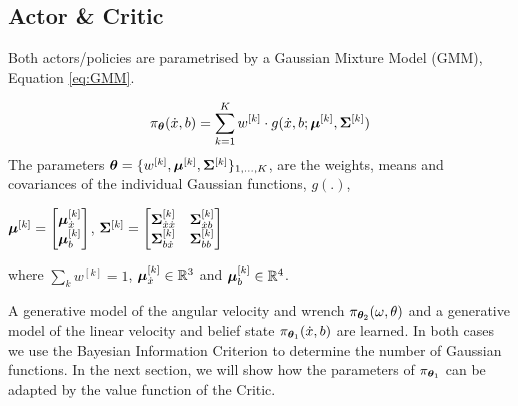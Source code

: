 \subsection{Actor \& Critic}
Both actors/policies are parametrised by a Gaussian Mixture Model (GMM), Equation \ref{eq:GMM}.

\begin{equation}
 \pi_{\boldsymbol{\theta}}(\dot{x},b) = \sum\limits_{k=1}^{K} w^{[k]}	    \cdot  g(\dot{x},b;\boldsymbol{\mu}^{[k]},\boldsymbol{\Sigma}^{[k]}) \label{eq:GMM}
\end{equation}
The parameters $\boldsymbol{\theta} = \{w^{[k]},\boldsymbol{\mu}^{[k]},\boldsymbol{\Sigma}^{[k]}\}_{1,\dots,K}$, are the weights, means and covariances 
of the individual Gaussian functions, $g(.)$,
\begin{center}
$\boldsymbol{\mu}^{[k]} =  \begin{bmatrix} \boldsymbol{\mu}^{[k]}_{\dot{x}} \\ \boldsymbol{\mu}^{[k]}_{b} \end{bmatrix}$, 
$\boldsymbol{\Sigma}^{[k]} =  \begin{bmatrix} 
	  \boldsymbol{\Sigma}^{[k]}_{\dot{x}\dot{x}} & \boldsymbol{\Sigma}^{[k]}_{\dot{x}b} \\
	  \boldsymbol{\Sigma}^{[k]}_{b\dot{x}} & \boldsymbol{\Sigma}^{[k]}_{bb}
	  \end{bmatrix}$
\end{center}
where $\sum_{k} w^{[k]} = 1$, $\boldsymbol{\mu}^{[k]}_{\dot{x}} \in \mathbb{R}^{3}$ and  $\boldsymbol{\mu}^{[k]}_{b} \in \mathbb{R}^{4}$.

A generative model of the angular velocity and wrench $\pi_{\boldsymbol{\theta}_2}(\omega,\theta)$ and a generative model 
of the linear velocity and belief state $\pi_{\boldsymbol{\theta}_1}(\dot{x},b)$ are learned. 
In both cases we use the Bayesian Information Criterion to determine the number of Gaussian functions.
In the next section, we will show how the parameters of $\pi_{\boldsymbol{\theta}_1}$ can be adapted by the value function of the Critic.


